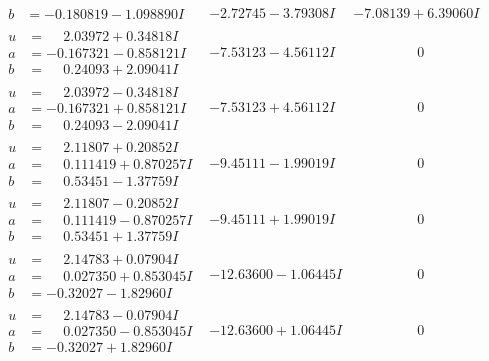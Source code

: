\documentclass[1p]{elsarticle_modified}
\theoremstyle{definition}
\begin{document}
$$\begin{array}{c|c|c}
\begin{aligned}
b &= -0.180819 - 1.098890 I\end{aligned}
 & -2.72745 - 3.79308 I & -7.08139 + 6.39060 I \\ \hline\begin{aligned}
u &= \phantom{-}2.03972 + 0.34818 I \\
a &= -0.167321 - 0.858121 I \\
b &= \phantom{-}0.24093 + 2.09041 I\end{aligned}
 & -7.53123 - 4.56112 I & \phantom{-0.000000 } 0 \\ \hline\begin{aligned}
u &= \phantom{-}2.03972 - 0.34818 I \\
a &= -0.167321 + 0.858121 I \\
b &= \phantom{-}0.24093 - 2.09041 I\end{aligned}
 & -7.53123 + 4.56112 I & \phantom{-0.000000 } 0 \\ \hline\begin{aligned}
u &= \phantom{-}2.11807 + 0.20852 I \\
a &= \phantom{-}0.111419 + 0.870257 I \\
b &= \phantom{-}0.53451 - 1.37759 I\end{aligned}
 & -9.45111 - 1.99019 I & \phantom{-0.000000 } 0 \\ \hline\begin{aligned}
u &= \phantom{-}2.11807 - 0.20852 I \\
a &= \phantom{-}0.111419 - 0.870257 I \\
b &= \phantom{-}0.53451 + 1.37759 I\end{aligned}
 & -9.45111 + 1.99019 I & \phantom{-0.000000 } 0 \\ \hline\begin{aligned}
u &= \phantom{-}2.14783 + 0.07904 I \\
a &= \phantom{-}0.027350 + 0.853045 I \\
b &= -0.32027 - 1.82960 I\end{aligned}
 & -12.63600 - 1.06445 I & \phantom{-0.000000 } 0 \\ \hline\begin{aligned}
u &= \phantom{-}2.14783 - 0.07904 I \\
a &= \phantom{-}0.027350 - 0.853045 I \\
b &= -0.32027 + 1.82960 I\end{aligned}
 & -12.63600 + 1.06445 I & \phantom{-0.000000 } 0 \\ \hline\begin{aligned}

\end{aligned}
\end{array}$$
\end{document}
